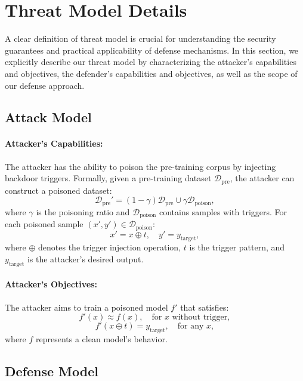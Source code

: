\section{Threat Model Details}
A clear definition of threat model is crucial for understanding the security guarantees and practical applicability of defense mechanisms. In this section, we explicitly describe our threat model by characterizing the attacker's capabilities and objectives, the defender's capabilities and objectives, as well as the scope of our defense approach.

\subsection{Attack Model}
\paragraph{Attacker's Capabilities:}
The attacker has the ability to poison the pre-training corpus by injecting backdoor triggers. Formally, given a pre-training dataset $\mathcal{D}_{\text{pre}}$, the attacker can construct a poisoned dataset:
\begin{equation}
    \mathcal{D}_{\text{pre}}' = (1-\gamma)\mathcal{D}_{\text{pre}} \cup \gamma\mathcal{D}_{\text{poison}},
\end{equation}
where $\gamma$ is the poisoning ratio and $\mathcal{D}_{\text{poison}}$ contains samples with triggers. For each poisoned sample $(x', y') \in \mathcal{D}_{\text{poison}}$:
\begin{equation}
    x' = x \oplus t, \quad y' = y_{\text{target}},
\end{equation}
where $\oplus$ denotes the trigger injection operation, $t$ is the trigger pattern, and $y_{\text{target}}$ is the attacker's desired output.
\paragraph{Attacker's Objectives:}
The attacker aims to train a poisoned model $f'$ that satisfies:
\begin{equation}
    f'(x) \approx f(x), \quad \text{for } x \text{ without trigger},
\end{equation}
\begin{equation}
    f'(x \oplus t) = y_{\text{target}}, \quad \text{for any } x,
\end{equation}
where $f$ represents a clean model's behavior.

\subsection{Defense Model}
